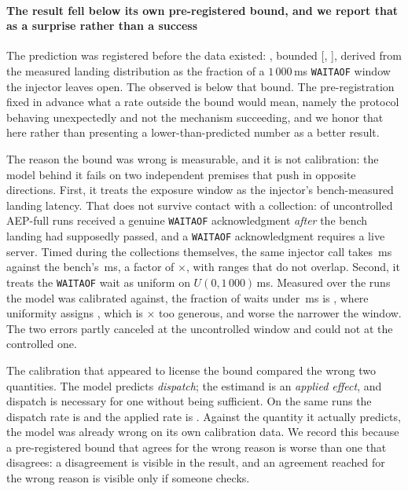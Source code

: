 \paragraph{The result fell below its own pre-registered bound, and we report
that as a surprise rather than a success} The prediction was registered before
the data existed: \ArmAPredicted{}, bounded [\ArmABoundLow{},
\ArmABoundHigh{}], derived from the measured landing distribution as the
fraction of a $1\,000$\,ms \texttt{WAITAOF} window the injector leaves open.
The observed \ArmAAepRate{} is below that bound. The pre-registration
fixed in advance what a rate outside the bound would mean, namely the protocol
behaving unexpectedly and not the mechanism succeeding, and we honor that here
rather than presenting a lower-than-predicted number as a better result.

The reason the bound was wrong is measurable, and it is not calibration: the
model behind it fails on two independent premises that push in opposite
directions. First, it treats the exposure window as the injector's bench-measured
landing latency. That does not survive contact with a collection:
\ModelAcksPastLanding{} of \ModelAckN{} uncontrolled AEP-full runs received a
genuine \texttt{WAITAOF} acknowledgment \emph{after} the bench landing had
supposedly passed, and a \texttt{WAITAOF} acknowledgment requires a live
server. Timed during the collections themselves, the same injector call takes
\ModelInSituKill{}\,ms against the bench's \ModelBenchKill{}\,ms, a factor of
\ModelInSituRatio{}$\times$, with ranges that do not overlap. Second, it treats
the \texttt{WAITAOF} wait as uniform on $U(0, 1\,000)$\,ms. Measured over the
runs the model was calibrated against, the fraction of waits under
\ControlledLanding{}\,ms is \ModelEmpiricalWindow{}, where uniformity assigns
\ModelUniformWindow{}, which is \ModelUniformOverstates{}$\times$ too generous,
and worse the narrower the window. The two errors partly canceled at the
uncontrolled window and could not at the controlled one.

The calibration that appeared to license the bound compared the wrong two
quantities. The model predicts \emph{dispatch}; the estimand is an
\emph{applied effect}, and dispatch is necessary for one without being
sufficient. On the same runs the dispatch rate is \ModelDispatchRate{} and the
applied rate is \ModelAppliedRate{}. Against the quantity it actually predicts,
the model was already wrong on its own calibration data. We record this because
a pre-registered bound that agrees for the wrong reason is worse than one that
disagrees: a disagreement is visible in the result, and an agreement
reached for the wrong reason is visible only if someone checks.

